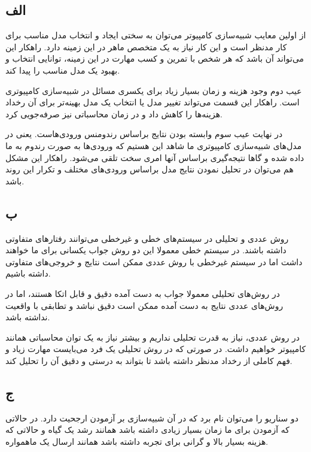 \subsection*{الف}
از اولین معایب شبیه‌سازی کامپیوتر می‌توان به سختی ایجاد و انتخاب مدل مناسب برای کار مدنظر است و این کار نیاز به یک متخصص ماهر در این زمینه دارد. راهکار این می‌تواند آن باشد که هر شخص با تمرین و کسب مهارت در این زمینه، توانایی انتخاب و بهبود یک مدل مناسب را پیدا کند.

عیب دوم وجود هزینه و زمان بسیار زیاد برای یکسری مسائل در شبیه‌سازی کامپیوتری است. راهکار این قسمت می‌تواند تغییر مدل یا انتخاب یک مدل بهینه‌تر برای آن رخداد هزینه‌ها را کاهش داد و در زمان محاسباتی نیز صرفه‌جویی کرد.

در نهایت عیب سوم وابسته بودن نتایج براساس رندومنس ورودی‌هاست. یعنی در مدل‌های شبیه‌سازی کامپیوتری ما شاهد این هستیم که ورودی‌ها به صورت رندوم به ما داده شده و گاها نتیجه‌گیری براساس آنها امری سخت تلقی می‌شود. راهکار این مشکل هم‌ می‌توان در تحلیل نمودن نتایج مدل براساس ورودی‌های مختلف و تکرار این روند باشد.

\subsection*{ب}
روش عددی و تحلیلی در سیستم‌های خطی و غیرخطی می‌توانند رفتارهای متفاوتی داشته باشند. در سیستم خطی معمولا این دو روش جواب یکسانی برای ما خواهند داشت اما در سیستم غیرخطی با روش عددی ممکن است نتایج و خروجی‌های متفاوتی داشته باشیم.

در روش‌های تحلیلی معمولا جواب به دست آمده دقیق و قابل اتکا هستند، اما در روش‌های عددی نتایج به دست آمده ممکن است دقیق نباشد و تطابقی با واقعیت نداشته باشد.

در روش عددی، نیاز به قدرت تحلیلی نداریم و بیشتر نیاز به یک توان محاسباتی همانند کامپیوتر خواهیم داشت. در صورتی که در روش تحلیلی یک فرد می‌بایست مهارت زیاد و فهم کاملی از رخداد مدنظر داشته باشد تا بتواند به درستی و دقیق آن را تحلیل کند.

\subsection*{ج}
دو سناریو را می‌توان نام برد که در آن شبیه‌سازی بر آزمودن ارجحیت دارد. در حالاتی که آزمودن برای ما زمان بسیار زیادی داشته باشد همانند رشد یک گیاه و حالاتی که هزینه بسیار بالا و گرانی برای تجربه داشته باشد همانند ارسال یک ماهمواره.